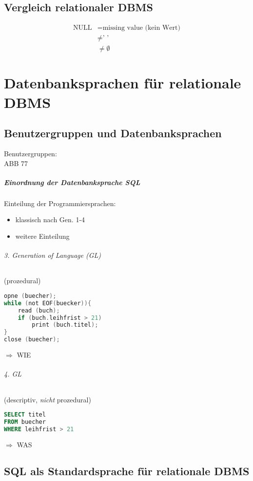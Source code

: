 \section{Vergleich relationaler DBMS}
\begin{align*}
\text{NULL} &= \text{missing value (kein Wert)}\\
&\not = \text{' '}\\
&\not = \emptyset
\end{align*}

\chapter{Datenbanksprachen für relationale DBMS}
\section{Benutzergruppen und Datenbanksprachen}
Benutzergruppen:\\
ABB 77
\paragraph{Einordnung der Datenbanksprache SQL}
Einteilung der Programmiersprachen:
\begin{itemize}
\item klassisch nach Gen. 1-4
\item weitere Einteilung
\end{itemize}
\subparagraph{3. Generation of Language (GL)}
(prozedural)
\begin{lstlisting}[language=C]
opne (buecher);
while (not EOF(buecker)){
	read (buch);
	if (buch.leihfrist > 21)
		print (buch.titel);
}
close (buecher);
\end{lstlisting}
$\Rightarrow$ WIE
\subparagraph{4. GL}
(descriptiv, \emph{nicht} prozedural)
\begin{lstlisting}[language=SQL]
SELECT titel
FROM buecher
WHERE leihfrist > 21
\end{lstlisting}
$\Rightarrow$ WAS

\section{SQL als Standardsprache für relationale DBMS}
